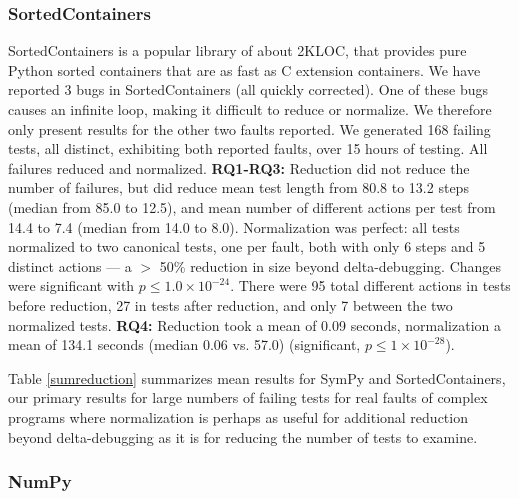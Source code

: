 \subsubsection{SortedContainers}

SortedContainers \cite{SortedContainers} is a popular library
of about 2KLOC, that provides pure Python sorted containers that are as fast as C
extension containers.  We have reported 3 bugs in SortedContainers
(all quickly corrected).  One of these bugs causes an infinite loop,
making it difficult to reduce or normalize.  We therefore only present
results for the other two faults reported.  We
generated 168 failing tests, all distinct, exhibiting both reported
faults, over 15 hours of testing. All failures reduced and normalized.
{\bf RQ1-RQ3:} Reduction did not reduce
the number of failures, but did reduce mean test length from
80.8 to 13.2 steps (median from 85.0 to 12.5), and mean number of
different actions per test from 14.4 to 7.4 (median from 14.0 to 8.0).
Normalization was perfect:  all tests normalized to two canonical
tests, one per fault, both with only 6 steps and 5
distinct actions --- a $>$ 50\% reduction in size beyond delta-debugging.  Changes were significant with
$p\leq1.0\times10^{-24}$.  There were 95 total
different actions in tests before reduction, 27 in tests after
reduction, and only 7 between the two normalized tests.  {\bf RQ4:} Reduction took a mean of 0.09 seconds, normalization a mean of 134.1
seconds (median 0.06 vs. 57.0) (significant, $p\leq1\times10^{-28}$).  

Table \ref{sumreduction} summarizes mean results for SymPy and
SortedContainers, our primary results for large numbers of failing
tests for real faults of complex programs where normalization is
perhaps as useful for additional reduction beyond delta-debugging as
it is for reducing the number of tests to examine.

\subsubsection{NumPy}

